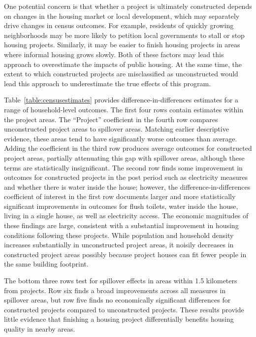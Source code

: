 \documentclass[12pt]{article}
\begin{document}
One potential concern is that whether a project is ultimately constructed depends on changes in the housing market or local development, which may separately drive changes in census outcomes.  For example, residents of quickly growing neighborhoods may be more likely to petition local governments to stall or stop housing projects.  Similarly, it may be easier to finish housing projects in areas where informal housing grows slowly.  Both of these factors may lead this approach to overestimate the impacts of public housing.  At the same time, the extent to which constructed projects are misclassified as unconstructed would lead this approach to underestimate the true effects of this program.

Table~\ref{table:censusestimates} provides difference-in-differences estimates for a range of household-level outcomes.  The first four rows contain estimates within the project areas.  The ``Project'' coefficient in the fourth row compares unconstructed project areas to spillover areas.  Matching earlier descriptive evidence, these areas tend to have significantly worse outcomes than average.  Adding the coefficient in the third row produces average outcomes for constructed project areas, partially attenuating this gap with spillover areas, although these terms are statistically insignificant.  The second row finds some improvement in outcomes for constructed projects in the post period such as electricity measures and whether there is water inside the house; however, the difference-in-differences coefficient of interest in the first row documents larger and more statistically significant improvements in outcomes for flush toilets, water inside the house, living in a single house, as well as electricity access.  The economic magnitudes of these findings are large, consistent with a substantial improvement in housing conditions following these projects.  While population and household density increases substantially in unconstructed project areas, it noisily decreases in constructed project areas possibly because project houses can fit fewer people in the same building footprint.

The bottom three rows test for spillover effects in areas within 1.5 kilometers from projects.  Row six finds a broad improvements across all measures in spillover areas, but row five finds no economically significant differences for constructed projects compared to unconstructed projects.  These results provide little evidence that finishing a housing project differentially benefits housing quality in nearby areas.
\end{document}
